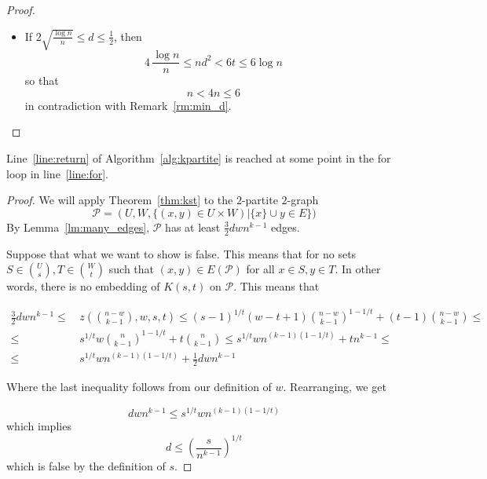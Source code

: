 \begin{lemma}
\begin{proof}
\begin{itemize}
            \item If $2 \sqrt{\frac{\log n}{n}} \leq d \leq \frac{1}{2}$, then
            \[
                4 \, \frac{\log n}{n} \leq nd^2 < 6t \leq 6 \log n
            \]
            so that
            \[
                n < 4 n \leq 6
            \]
            in contradiction with Remark~\ref{rm:min_d}. \qedhere
        \end{itemize}
    \end{proof}
\end{lemma}

\begin{lemma}\label{lm:return}
    Line~\ref{line:return} of Algorithm~\ref{alg:kpartite} is reached at some point in the for
    loop in line~\ref{line:for}.
    \begin{proof}
        We will apply Theorem~\ref{thm:kst} to the $2$-partite $2$-graph
        \[
            \mathcal{P} = (U, W, \{(x, y) \in U \times W) | \{x\} \cup y \in E \})
        \]
        By Lemma~\ref{lm:many_edges}, $\mathcal{P}$ has at least
        $\frac{3}{2}dwn^{k-1}$ edges.

        Suppose that what we want to show is false.
        This means that for no sets $S \in \binom{U}{s}, T \in \binom{W}{t}$
        such that $(x, y) \in E (\mathcal{P})$ for all $x \in S, y \in T $.
        In other words, there is no embedding of $K(s, t)$ on $\mathcal{P}$.
        This means that


        \begin{align*}
            \frac{3}{2}dwn^{k-1} \leq &
            \, z \left(\binom{n - w}{k-1}, w, s, t  \right) \leq
            (s-1)^{1/t}(w-t+1)\binom{n-w}{k-1}^{1-1/t} + (t-1)\binom{n-w}{k-1} \leq \\
            \leq & \, s^{1/t} w \binom{n}{k-1}^{1-1/t} + t \binom{n}{k-1} \leq
             s^{1/t} wn^{(k-1)(1-1/t)} + tn^{k-1} \leq \\
            \leq & \, s^{1/t} wn^{(k-1)(1-1/t)} + \frac{1}{2} dwn^{k-1}
        \end{align*}

        Where the last inequality follows from our definition of $w$.
        Rearranging, we get

        \[
            dwn^{k-1} \leq s^{1/t} wn^{(k-1)(1-1/t)}
        \]
        which implies
        \[
            d \leq \left(\frac{s}{n^{k-1}}\right)^{1/t}
        \]
        which is false by the definition of $s$.
    \end{proof}
\end{lemma}


